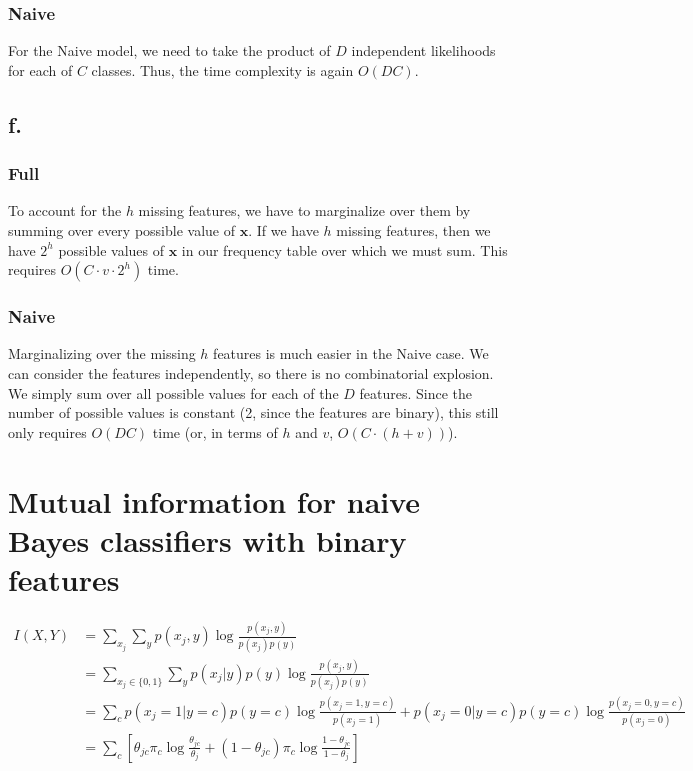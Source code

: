 \documentclass{article}
\begin{document}
\subsubsection{Naive}

For the Naive model, we need to take the product of $D$ independent
likelihoods for each of $C$ classes. Thus, the time complexity is
again $O(DC)$.

\subsection{f.}

\subsubsection{Full}

To account for the $h$ missing features, we have to marginalize over
them by summing over every possible value of $\mathbf{x}$. If we have
$h$ missing features, then we have $2^h$ possible values of
$\mathbf{x}$ in our frequency table over which we must sum. This
requires $O(C \cdot v \cdot 2^h)$ time.

\subsubsection{Naive}

Marginalizing over the missing $h$ features is much easier in the
Naive case. We can consider the features independently, so there is no
combinatorial explosion. We simply sum over all possible values for
each of the $D$ features. Since the number of possible values is
constant (2, since the features are binary), this still only requires
$O(DC)$ time (or, in terms of $h$ and $v$, $O(C \cdot (h + v))$).

\section{Mutual information for naive Bayes classifiers with binary features}

\begin{align*}
  I(X,Y) &= \sum_{x_j} \sum_y p(x_j, y) \log \frac{p(x_j,
           y)}{p(x_j)p(y)} \\
         &= \sum_{x_j \in \{0,1\}} \sum_y p(x_j|y) p(y) \log \frac{p(x_j,
           y)}{p(x_j)p(y)} \\
         &= \sum_c p(x_j=1|y=c) p(y=c) \log \frac{p(x_j=1,
           y=c)}{p(x_j=1)} + p(x_j=0|y=c) p(y=c) \log
           \frac{p(x_j=0, y=c)}{p(x_j=0)} \\
         &= \sum_c \left[ \theta_{jc} \pi_c \log
           \frac{\theta_{jc}}{\theta_j} + (1 - \theta_{jc}) \pi_c \log
           \frac{1 - \theta_{jc}}{1 - \theta_j} \right] \\
\end{align*}
\end{document}
